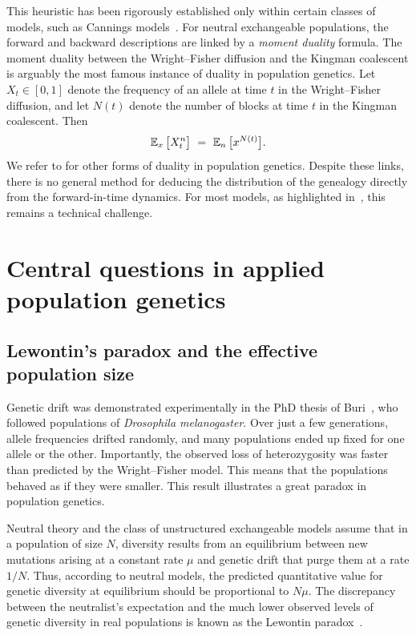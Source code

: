 This heuristic has been rigorously established only within certain classes of models, such as Cannings models~\cite{mohle_convergence_1998,Mohle_Sagitov}. For neutral exchangeable populations, the forward and backward descriptions are linked by a \emph{moment duality} formula.
The moment duality between the Wright--Fisher diffusion and the Kingman coalescent is arguably the most famous instance of duality in population genetics. Let $X_t \in [0,1]$ denote the frequency of an allele at time $t$ in the Wright--Fisher diffusion, and let $N(t)$ denote the number of blocks at time $t$ in the Kingman coalescent. Then
\[
\operatorname{\mathbb{E}}_{x}\big[X_t^{n}\big]\ =\ \operatorname{\mathbb{E}}_n\big[x^{ N(t)}\big].
\]
We refer to \cite{etheridge_mathematical_2011,ethier_1986, mohle_concept_1999, carinci_dualities_2015, cordero_bernstein_2026, blath_separation_2021,etheridge_coalescent_2010} for other forms of duality in population genetics.
Despite these links, there is no general method for deducing the distribution of the genealogy directly from the forward-in-time dynamics. For most models, as highlighted in~\cite{Julie_Zsofia}, this remains a technical challenge.

 
\section{Central questions in applied population genetics}

\subsection{Lewontin's paradox and the effective population size}


Genetic drift was demonstrated experimentally in the PhD thesis of Buri~\cite{buri_gene_1956}, who followed populations of \emph{Drosophila melanogaster}. Over just a few generations, allele frequencies drifted randomly, and many populations ended up fixed for one allele or the other. Importantly, the observed loss of heterozygosity was faster than predicted by the Wright--Fisher model. This means that the populations behaved as if they were smaller. This result illustrates a great paradox in population genetics.


Neutral theory and the class of unstructured exchangeable models assume that in a population of size $N$, diversity results from an equilibrium between new mutations arising at a constant rate $\mu$ and genetic drift that purge them at a rate $1/N$. Thus, according to neutral models, the predicted quantitative  value for genetic diversity at equilibrium should be proportional to $N\mu$. The discrepancy between the neutralist's expectation and the much lower observed levels of genetic diversity in real populations is known as the Lewontin paradox~\cite{lewontin_genetic_1974, leffler_revisiting_2012}.


